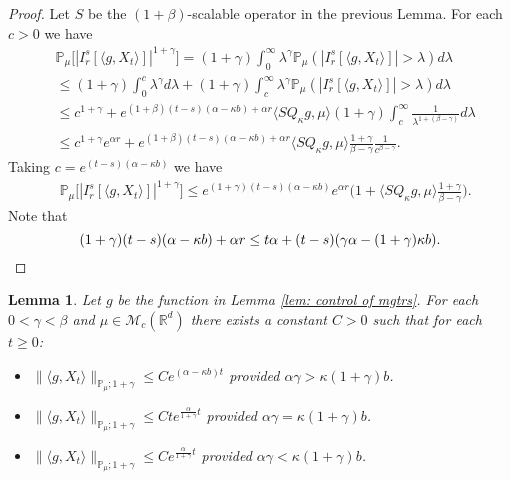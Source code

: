 \documentclass[12pt,oneside,english]{amsart}
\theoremstyle{plain}
\newtheorem{lem}[thm]{Lemma}
\theoremstyle{definition}
\numberwithin{equation}{section}
\newcommand{\added}[1]{{\color{blue}#1}}\newcommand{\deleted}[1]{{\color{red}#1}}
\begin{document}
\begin{proof}
Let $S$ be the $(1+\beta)$-scalable operator in the previous Lemma.
    For each $c>0$ we have
\begin{align}
    &\mathbb P_\mu\big[|I_r^s[\langle g, X_t\rangle]|^{1+\gamma}\big]
    = (1+\gamma)\int_0^\infty \lambda^{\gamma} \mathbb P_{\mu}(|I_r^s[\langle g, X_t\rangle]|>\lambda) d\lambda
    \\&\leq (1+\gamma)\int_0^c \lambda^{\gamma} d\lambda +(1+\gamma)\int_c^\infty \lambda^{\gamma}\mathbb P_\mu(|I_r^s[\langle g, X_t\rangle]|> \lambda) d\lambda
    \\& \leq c^{1+\gamma} + e^{(1+\beta)(t-s)(\alpha- \kappa b) + \alpha r} \langle SQ_{\kappa}g,\mu\rangle  (1+\gamma)\int_c^\infty \frac{1}{\lambda^{1+(\beta-\gamma)}}d\lambda
    \\&\leq c^{1+\gamma} e^{\alpha r} + e^{(1+\beta)(t-s)(\alpha- \kappa b) + \alpha r} \langle SQ_{\kappa}g,\mu\rangle   \frac{1+\gamma}{\beta - \gamma} \frac{1}{c^{\beta - \gamma}}.
\end{align}
    Taking $c = e^{(t-s)(\alpha- \kappa b)}$ we have
\begin{align}
    &\mathbb P_\mu\big[|I_r^s[\langle g, X_t\rangle]|^{1+\gamma}\big]
    \leq e^{(1+\gamma)(t-s)(\alpha- \kappa b)} e^{\alpha r}\Big(1+ \langle SQ_{\kappa}g,\mu\rangle \frac{1+\gamma}{\beta - \gamma}\Big).
\end{align}
    Note that
\[
    (1+\gamma)(t-s)(\alpha- \kappa b) + \alpha r
    \leq t\alpha+(t-s) (\gamma\alpha- (1+\gamma)\kappa b).
    \qedhere
\]
\end{proof}
\begin{lem}
\label{lem: control moment}
    \added{Let $g$ be the function in Lemma \ref{lem: control of mgtrs}.}
    For each $0 < \gamma < \beta$ and $\mu\in \mathcal M_c(\mathbb R^d)$ there exists a constant $C>0$ such that for each $t\geq 0$:
\begin{itemize}
\item[(1)]
    $\|\langle g,X_t\rangle\|_{\mathbb{P}_{\mu};1+\gamma}\leq C e^{(\alpha-\kappa b)t}$ provided $\alpha\gamma > \kappa (1+\gamma)b$.
\item[(2)]
    $\|\langle g,X_t\rangle\|_{\mathbb{P}_{\mu};1+\gamma}\leq C te^{\frac{\alpha}{1+\gamma}t}$ provided $\alpha\gamma = \kappa (1+\gamma)b$.
\item[(3)]
    $\|\langle g,X_t\rangle\|_{\mathbb{P}_{\mu};1+\gamma}\leq C e^{\frac{\alpha}{1+\gamma}t}$ provided $\alpha\gamma < \kappa (1+\gamma)b$.
\end{itemize}
\end{lem}
\end{document}
